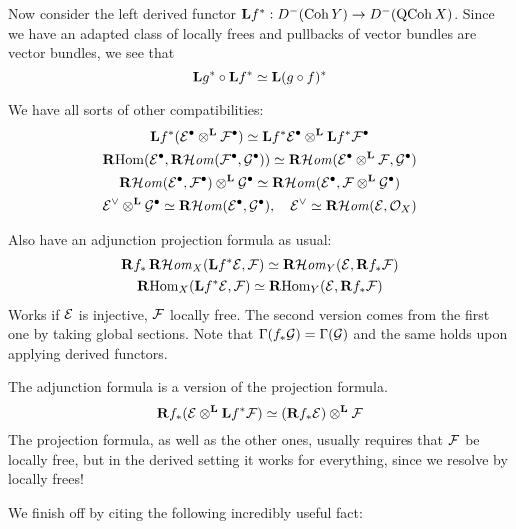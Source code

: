  Now consider the left derived functor $\mathbf{L} f^*:D^-(\operatorname{Coh} Y)\to D^-(\operatorname{QCoh} X)$. Since we have an adapted class of locally frees and pullbacks of vector bundles are vector bundles, we see that
\begin{equation*}
    \mathbf{L} g^*\circ\mathbf{L} f^* \simeq \mathbf{L}(g\circ f)^*
\end{equation*}

We have all sorts of other compatibilities:
\begin{gather*}
    \mathbf{L} f^*(\mathcal{E}^\bullet\otimes^{\mathbf{L}}\mathcal{F}^\bullet)
        \simeq \mathbf{L} f^*\mathcal{E}^\bullet\otimes^{\mathbf{L}}\mathbf{L} f^*\mathcal{F}^\bullet \\
    \operatorname{\mathbf{R} Hom}(\mathcal{E}^\bullet,\operatorname{\mathbf{R}\mathcal{H}\mathit{om}}(\mathcal{F}^\bullet,\mathcal{G}^\bullet))
        \simeq \operatorname{\mathbf{R}\mathcal{H}\mathit{om}}(\mathcal{E}^\bullet\otimes^{\mathbf{L}}\mathcal{F},\mathcal{G}^\bullet) \\
    \operatorname{\mathbf{R}\mathcal{H}\mathit{om}}(\mathcal{E}^\bullet,\mathcal{F}^\bullet)\otimes^{\mathbf{L}}\mathcal{G}^\bullet
        \simeq \operatorname{\mathbf{R}\mathcal{H}\mathit{om}}(\mathcal{E}^\bullet,\mathcal{F}\otimes^{\mathbf{L}}\mathcal{G}^\bullet)\\
    \mathcal{E}^\vee\otimes^{\mathbf{L}}\mathcal{G}^\bullet
        \simeq \operatorname{\mathbf{R}\mathcal{H}\mathit{om}}(\mathcal{E}^\bullet,\mathcal{G}^\bullet), \quad
    \mathcal{E}^\vee
        \simeq \operatorname{\mathbf{R}\mathcal{H}\mathit{om}}(\mathcal{E},\mathcal{O}_X)
\end{gather*}

Also have an adjunction projection formula as usual:
\begin{gather*}
    \mathbf{R} f_*\operatorname{\mathbf{R}\mathcal{H}\mathit{om}}_X(\mathbf{L} f^*\mathcal{E},\mathcal{F})
        \simeq \operatorname{\mathbf{R}\mathcal{H}\mathit{om}}_Y(\mathcal{E},\mathbf{R} f_*\mathcal{F}) \\
    \operatorname{\mathbf{R} Hom}_X(\mathbf{L} f^*\mathcal{E},\mathcal{F})
        \simeq \operatorname{\mathbf{R} Hom}_Y(\mathcal{E},\mathbf{R} f_*\mathcal{F})
\end{gather*}
Works if $\mathcal{E}$ is injective, $\mathcal{F}$ locally free. The second version comes from the first one by taking global sections. Note that $\Gamma(f_*\mathcal{G})=\Gamma(\mathcal{G})$ and the same holds upon applying derived functors.

The adjunction formula is a version of the projection formula.
\begin{equation*}
    \mathbf{R} f_*(\mathcal{E}\otimes^{\mathbf{L}}\mathbf{L} f^*\mathcal{F})
        \simeq (\mathbf{R} f_*\mathcal{E})\otimes^{\mathbf{L}}\mathcal{F}
\end{equation*}
The projection formula, as well as the other ones, usually requires that $\mathcal{F}$ be locally free, but in the derived setting it works for everything, since we resolve by locally frees!

We finish off by citing the following incredibly useful fact:

